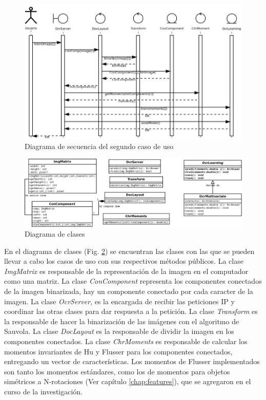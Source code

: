 \documentclass[a4paper, 11pt, oneside]{report}
\begin{document}
\begin{figure}
\begin{center}
\includegraphics[width=20cm]{diagrams/sequence2.jpeg}
\end{center}
\caption{Diagrama de secuencia del segundo caso de uso}
\label{fig:sequence2}
\end{figure}

\begin{figure}
\begin{center}
\includegraphics[width=20cm]{diagrams/clases.jpg}
\end{center}
\caption{Diagrama de clases}
\label{fig:classes}
\end{figure}

En el diagrama de clases (Fig. \ref{fig:classes}) se encuentran las clases con las que se pueden llevar a cabo los casos de uso con sus respectivos métodos públicos. La clase {\it ImgMatrix} es responsable de la representación de la imagen en el computador como una matriz. La clase {\it ConComponent} representa los componentes conectados de la imagen binarizada, hay un componente conectado por cada caracter de la imagen. La clase {\it OcrServer}, es la encargada de recibir las peticiones IP y coordinar las otras clases para dar respuesta a la petición. La clase {\it Transform} es la responsable de hacer la binarización de las imágenes con el algoritmo de Sauvola. La clase {\it DocLayout} es la responsable de dividir la imagen en los componentes conectados. La clase {\it ChrMoments} es responsable de calcular los momentos invariantes de Hu y Flusser para los componentes conectados, entregando un vector de características. Los momentos de Flusser implementados son tanto los momentos estándares, como los de momentos para objetos simétricos a N-rotaciones (Ver capítulo \ref{chap:features}), que se agregaron en el curso de la investigación.
\end{document}
